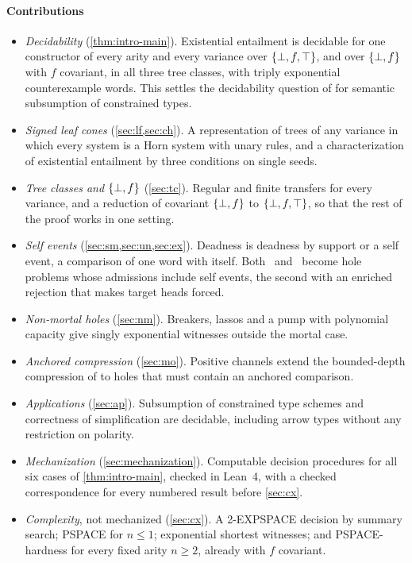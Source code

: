 \paragraph{Contributions}
\begin{itemize}[leftmargin=*]
\item \emph{Decidability} (\cref{thm:intro-main}). Existential entailment is
  decidable for one constructor of every arity and every variance over
  $\{\bot,f,\top\}$, and over $\{\bot,f\}$ with $f$ covariant, in all three tree classes, with
  triply exponential counterexample words. This settles the decidability
  question of \citet{TrifonovSmith96} for semantic subsumption of constrained
  types.
\item \emph{Signed leaf cones} (\cref{sec:lf,sec:ch}). A representation of
  trees of any variance in which every system is a Horn system with unary
  rules, and a characterization of existential entailment by three conditions
  on single seeds.
\item \emph{Tree classes and $\{\bot,f\}$} (\cref{sec:tc}). Regular and finite
  transfers for every variance, and a reduction of covariant $\{\bot,f\}$ to $\{\bot,f,\top\}$,
  so that the rest of the proof works in one setting.
\item \emph{Self events} (\cref{sec:sm,sec:un,sec:ex}). Deadness is deadness by
  support or a self event, a comparison of one word with itself. Both
  \CondU\ and \CondII\ become hole problems whose admissions include self
  events, the second with an enriched rejection that makes target heads forced.
\item \emph{Non-mortal holes} (\cref{sec:nm}). Breakers, lassos and a pump
  with polynomial capacity give singly exponential witnesses outside the
  mortal case.
\item \emph{Anchored compression} (\cref{sec:mo}). Positive channels extend the
  bounded-depth compression of \citet{Zhao26} to holes that must contain
  an anchored comparison.
\item \emph{Applications} (\cref{sec:ap}). Subsumption of constrained type
  schemes and correctness of simplification are decidable, including arrow
  types without any restriction on polarity.
\item \emph{Mechanization} (\cref{sec:mechanization}). Computable decision
  procedures for all six cases of \cref{thm:intro-main}, checked in Lean~4,
  with a checked correspondence for every numbered result before
  \cref{sec:cx}.
\item \emph{Complexity}, not mechanized (\cref{sec:cx}). A 2-EXPSPACE decision
  by summary search; PSPACE for $n\le1$; exponential shortest witnesses; and
  PSPACE-hardness for every fixed arity $n\ge2$, already with $f$ covariant.
\end{itemize}

